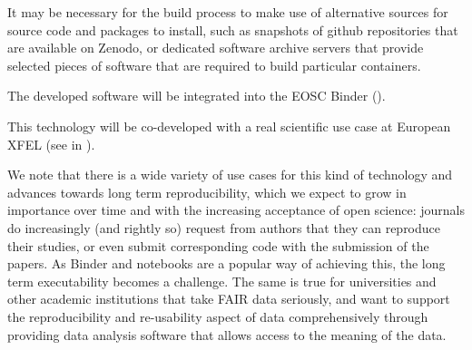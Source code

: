 \begin{task}[
  title=Archiving software environments for reproducible computation,
  id=reproducibility,
  lead=MP,
  PM=42,
  wphases={0-36},
  partners={SRL,QS,UIO}
]
\begin{compactitem}
  It may be necessary for the build process to make use of alternative
  sources for source code and packages to install, such as snapshots
  of github repositories that are available on Zenodo, or dedicated
  software archive servers that provide selected pieces of software
  that are required to build particular containers.

  The developed software will be integrated into the EOSC Binder
  ().
  \end{compactitem}



This technology will be co-developed with a real scientific use case at
European XFEL (see  in
).

  We note that there is a wide variety of use cases for this kind of
  technology and advances towards long term reproducibility, which we
  expect to grow in importance over time and with the increasing
  acceptance of open science: journals do increasingly (and rightly
  so) request from authors that they can reproduce their studies, or
  even submit corresponding code with the submission of the papers. As
  Binder and notebooks are a popular way of achieving this, the long
  term executability becomes a challenge. The same is true for
  universities and other academic institutions that take FAIR data
  seriously, and want to support the reproducibility and re-usability
  aspect of data comprehensively through providing data analysis
  software that allows access to the meaning of the data.
\end{task}
